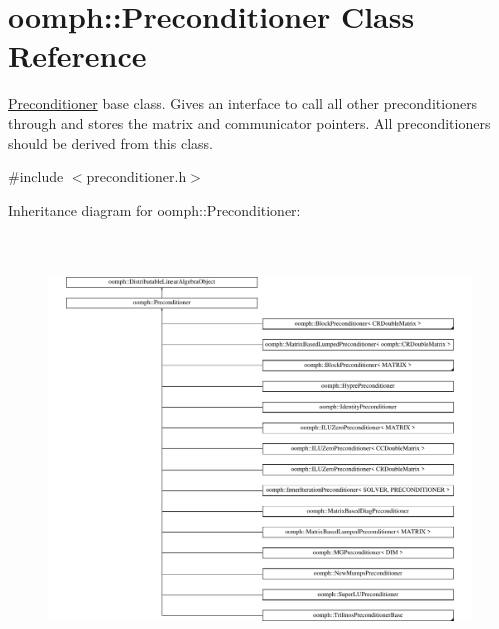 \hypertarget{classoomph_1_1Preconditioner}{}\section{oomph\+:\+:Preconditioner Class Reference}
\label{classoomph_1_1Preconditioner}


\hyperlink{classoomph_1_1Preconditioner}{Preconditioner} base class. Gives an interface to call all other preconditioners through and stores the matrix and communicator pointers. All preconditioners should be derived from this class.  




{\ttfamily \#include $<$preconditioner.\+h$>$}

Inheritance diagram for oomph\+:\+:Preconditioner\+:\begin{figure}[H]
\begin{center}
\leavevmode
\includegraphics[height=11.360382cm]{classoomph_1_1Preconditioner}
\end{center}
\end{figure}
